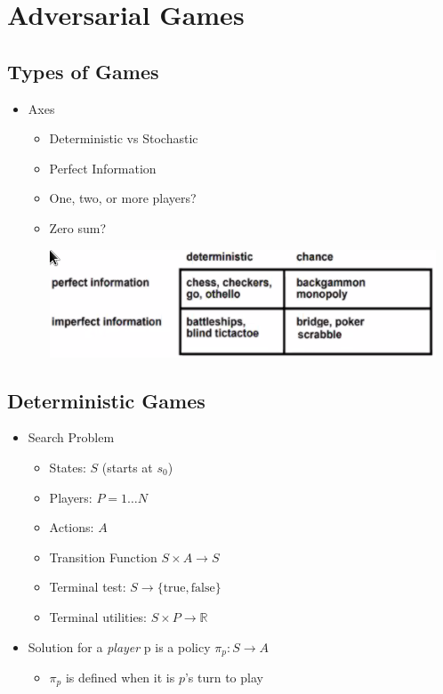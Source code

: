 \documentclass[11pt]{article}
\begin{document}
\section{Adversarial Games}
\label{sec:orgbb0eae1}
\subsection{Types of Games}
\label{sec:org5c2c88d}
\begin{itemize}
\item Axes
\begin{itemize}
\item Deterministic vs Stochastic
\item Perfect Information
\item One, two, or more players?
\item Zero sum?
\begin{center}
\includegraphics[width=.9\linewidth]{images/2020-09-24_17-13-31_screenshot.png}
\end{center}
\end{itemize}
\end{itemize}

\subsection{Deterministic Games}
\label{sec:org08127af}
\begin{itemize}
\item Search Problem
\begin{itemize}
\item States: \(S\) (starts at \(s_0\))
\item Players: \(P={1\dots N}\)
\item Actions: \(A\)
\item Transition Function \(S \times A \rightarrow S\)
\item Terminal test: \(S \rightarrow \{\text{true},\text{false}\}\)
\item Terminal utilities: \(S \times P \rightarrow \mathbb{R}\)
\end{itemize}
\item Solution for a \emph{player} p is a policy \(\pi_p:S \rightarrow A\)
\begin{itemize}
\item \(\pi_p\) is defined when it is \(p\)'s turn to play
\end{itemize}
\end{itemize}
\end{document}
